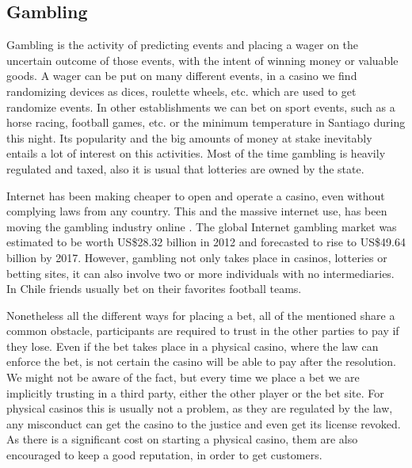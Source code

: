 \begin{intro}
\section{Gambling} \label{gambling}
Gambling is the activity of predicting events and placing a wager on the
  uncertain outcome of those events, with the intent of winning money or
  valuable goods.
A wager can be put on many different events, in a casino we find randomizing
  devices as dices, roulette wheels, etc. which are used to get randomize
  events. In other establishments we can bet on sport events, such as a horse
  racing, football games, etc. or the minimum temperature in Santiago during
  this night.
Its popularity and the big amounts of money at stake
  inevitably entails a lot of interest on this activities. Most of the time
  gambling is heavily regulated and taxed, also it is usual that lotteries are
  owned by the state.

Internet has been making cheaper to open and operate a casino, even without
  complying laws from any country.  This and the massive internet use, has been
  moving the gambling industry online\cite{shelat2002makes}
  \cite{griffiths2008internet}. The global Internet gambling market was
  estimated to be worth US\$28.32 billion in 2012 and forecasted to rise to
  US\$49.64 billion by 2017\cite{gainsbury2015risky}.
However, gambling not only takes place in casinos, lotteries or betting sites,
  it can also involve two or more individuals with no intermediaries. In Chile
  friends usually bet on their favorites football teams.
  
Nonetheless all the different ways for placing a bet, all of the mentioned
  share a common obstacle, participants are required to trust in the other
  parties to pay if they lose.
  Even if the bet takes place in a physical casino, where the law can enforce
  the bet, is not certain the casino will be able to pay after the resolution.
We might not be aware of the fact, but every time we place a bet we are
  implicitly trusting in a third party, either the other player or the bet
  site. For physical casinos this is usually not a problem, as they are
  regulated by the law, any misconduct can get the casino to the justice and
  even get its license revoked. As there is a significant cost on starting a
  physical casino, them are also encouraged to keep a good reputation, in order
  to get customers.


\end{intro}
